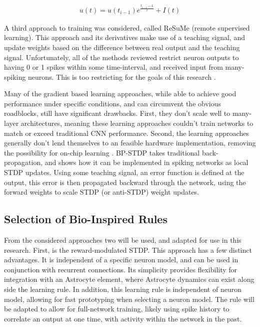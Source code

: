     \begin{align}
        u(t) = u(t_{i-1})e^{\frac{t_{i-1} - 1}{\tau}} + I(t) \label{eq:snn_stbp:eq2}
    \end{align}
    
    A third approach to training was considered, called ReSuMe (remote supervised learning). This approach and its derivatives make use of a teaching signal, and update weights based on the difference between real output and the teaching signal. Unfortunately, all of the methods reviewed restrict neuron outputs to having 0 or 1 spikes within some time-interval, and received input from many-spiking neurons. This is too restricting for the goals of this research \cite{deep_spike}.
    
    Many of the gradient based learning approaches, while able to achieve good performance under specific conditions, and can circumvent the obvious roadblocks, still have significant drawbacks. First, they don't scale well to many-layer architectures, meaning these learning approaches couldn't train networks to match or exceed traditional CNN performance. Second, the learning approaches generally don't lend themselves to an feasible hardware implementation, removing the possibility for on-chip learning \cite{bp_stdp}. BP-STDP takes traditional back-propagation, and shows how it can be implemented in spiking networks as local STDP updates. Using some teaching signal, an error function is defined at the output, this error is then propagated backward through the network, using the forward weights to scale STDP (or anti-STDP) weight updates.
    
    \subsection{Selection of Bio-Inspired Rules}
    From the considered approaches two will be used, and adapted for use in this research. First, is the reward-modulated STDP. This approach has a few distinct advantages. It is independent of a specific neuron model, and can be used in conjunction with recurrent connections. Its simplicity provides flexibility for integration with an Astrocyte element, where Astrocyte dynamics can exist along side the learning rule. In addition, this learning rule is independent of neuron model, allowing for fast prototyping when selecting a neuron model. The rule will be adapted to allow for full-network training, likely using spike history to correlate an output at one time, with activity within the network in the past.
    

